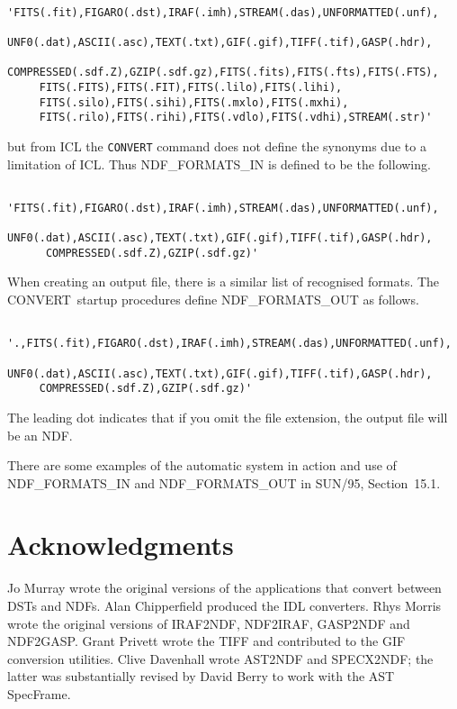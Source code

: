 \documentclass[twoside,11pt]{article}
\newcommand{\xref}[3]{#1}
\newcommand{\latexelsehtml}[2]{#1}
\newcommand{\latexelsehtml}[2]{#2}
\newcommand{\CONVERT}{{\footnotesize CONVERT}}
\begin{document}
\small
\begin{verbatim}
     'FITS(.fit),FIGARO(.dst),IRAF(.imh),STREAM(.das),UNFORMATTED(.unf),
     UNF0(.dat),ASCII(.asc),TEXT(.txt),GIF(.gif),TIFF(.tif),GASP(.hdr),
     COMPRESSED(.sdf.Z),GZIP(.sdf.gz),FITS(.fits),FITS(.fts),FITS(.FTS),
     FITS(.FITS),FITS(.FIT),FITS(.lilo),FITS(.lihi),
     FITS(.silo),FITS(.sihi),FITS(.mxlo),FITS(.mxhi),
     FITS(.rilo),FITS(.rihi),FITS(.vdlo),FITS(.vdhi),STREAM(.str)'
\end{verbatim}
\normalsize

but from ICL the \texttt{CONVERT} command does not define the synonyms due 
to a limitation of ICL.  Thus NDF\_FORMATS\_IN is defined to be the
following. 

\small
\begin{verbatim}
     'FITS(.fit),FIGARO(.dst),IRAF(.imh),STREAM(.das),UNFORMATTED(.unf),
      UNF0(.dat),ASCII(.asc),TEXT(.txt),GIF(.gif),TIFF(.tif),GASP(.hdr),
      COMPRESSED(.sdf.Z),GZIP(.sdf.gz)'
\end{verbatim}
\normalsize

When creating an output file, there is a similar list of recognised
formats.  The \CONVERT\ startup procedures define NDF\_FORMATS\_OUT
as follows.

\small
\begin{verbatim}
     '.,FITS(.fit),FIGARO(.dst),IRAF(.imh),STREAM(.das),UNFORMATTED(.unf),
     UNF0(.dat),ASCII(.asc),TEXT(.txt),GIF(.gif),TIFF(.tif),GASP(.hdr),
     COMPRESSED(.sdf.Z),GZIP(.sdf.gz)'
\end{verbatim}
\normalsize

The leading dot indicates that if you omit the file extension, the
output file will be an NDF.

There are some examples of the automatic system in action and use of
NDF\_FORMATS\_IN and NDF\_FORMATS\_OUT in
\latexelsehtml{SUN/95, Section~15.1.}{\xref{Automatic
Conversion.}{sun95}{se_autoconvert}}

\section{Acknowledgments}
Jo Murray wrote the original versions of the applications that convert
between DSTs and NDFs.  Alan Chipperfield produced the IDL converters.
Rhys Morris wrote the original versions of IRAF2NDF, NDF2IRAF, GASP2NDF
and NDF2GASP.  Grant Privett wrote the TIFF and contributed to the GIF
conversion utilities.  Clive Davenhall wrote AST2NDF and SPECX2NDF;
the latter was substantially revised by David Berry to work with the
AST SpecFrame.
\end{document}
